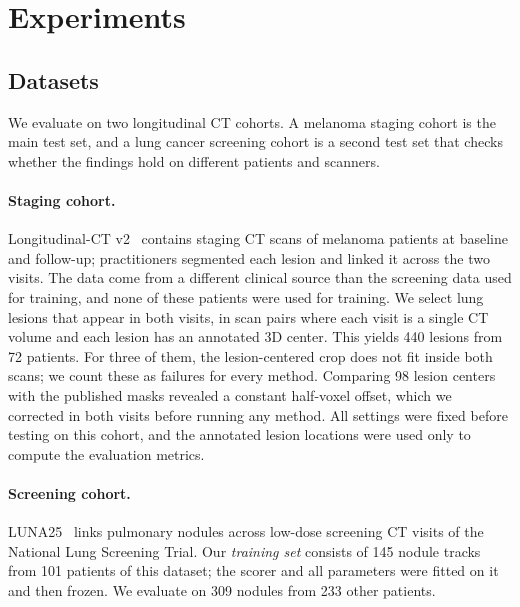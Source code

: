 \section{Experiments}
\label{sec:evaluation}
\subsection{Datasets}
We evaluate on two longitudinal CT cohorts.
A melanoma staging cohort is the main test set, and a lung cancer screening cohort is a second test set that checks whether the findings hold on different patients and scanners.

\paragraph{Staging cohort.}
Longitudinal-CT v2~\cite{gatidis2026longct,kuestner2025longct} contains staging CT scans of melanoma patients at baseline and follow-up; practitioners segmented each lesion and linked it across the two visits.
The data come from a different clinical source than the screening data used for training, and none of these patients were used for training.
We select lung lesions that appear in both visits, in scan pairs where each visit is a single CT volume and each lesion has an annotated 3D center.
This yields 440 lesions from 72 patients.
For three of them, the lesion-centered crop does not fit inside both scans; we count these as failures for every method.
Comparing 98 lesion centers with the published masks revealed a constant half-voxel offset, which we corrected in both visits before running any method.
All settings were fixed before testing on this cohort, and the annotated lesion locations were used only to compute the evaluation metrics.

\paragraph{Screening cohort.}
LUNA25~\cite{peeters2026,lunamarks,lunascans,nlstct} links pulmonary nodules across low-dose screening CT visits of the National Lung Screening Trial.
Our \emph{training set} consists of 145 nodule tracks from 101 patients of this dataset; the scorer and all parameters were fitted on it and then frozen.
We evaluate on 309 nodules from 233 other patients.

